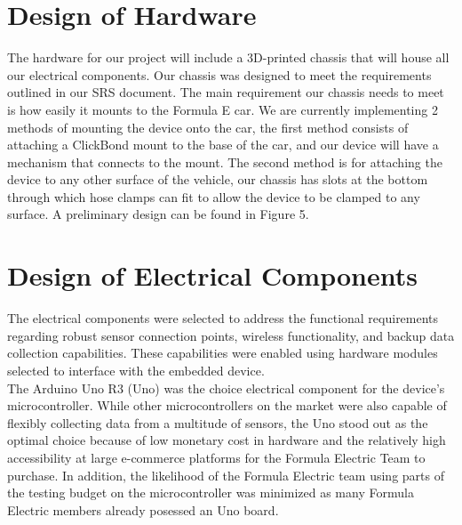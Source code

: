 \documentclass[12pt, titlepage]{article}
\begin{document}
\section{Design of Hardware}

The hardware for our project will include a 3D-printed chassis that will house all our electrical components. Our chassis was designed to meet the requirements outlined in our SRS document. The main requirement our chassis needs to meet is how easily it mounts to the Formula E car. We are currently implementing 2 methods of mounting the device onto the car, the first method consists of attaching a ClickBond mount to the base of the car, and our device will have a mechanism that connects to the mount. The second method is for attaching the device to any other surface of the vehicle, our chassis has slots at the bottom through which hose clamps can fit to allow the device to be clamped to any surface. A preliminary design can be found in Figure 5.


\newpage
\section{Design of Electrical Components}


The electrical components were selected to address the functional requirements regarding robust sensor connection points, wireless functionality, and backup data collection capabilities. These capabilities were enabled using hardware modules selected to interface with the embedded device. \\

The Arduino Uno R3 (Uno) was the choice electrical component for the device's microcontroller. While other microcontrollers on the market were also capable of flexibly collecting data from a multitude of sensors, the Uno stood out as the optimal choice because of low monetary cost in hardware and the relatively high accessibility at large e-commerce platforms for the Formula Electric Team to purchase. In addition, the likelihood of the Formula Electric team using parts of the testing budget on the microcontroller was minimized as many Formula Electric members already posessed an Uno board. \\
\end{document}
